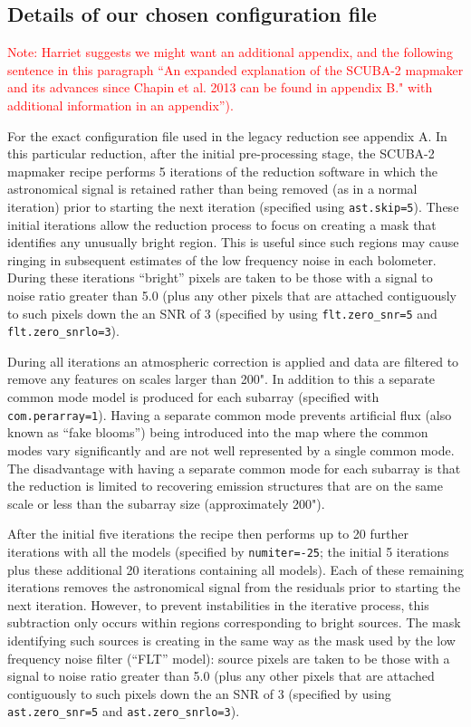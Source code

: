 \documentclass[usenatbib]{mnras}
\newcommand{\note}[1]{\textcolor{red}{Note: #1}}
\begin{document}
\subsection{Details of our chosen configuration file}

\note{Harriet suggests we might want an additional appendix, and the
  following sentence in this paragraph ``An expanded explanation of
  the SCUBA-2 mapmaker and its advances since Chapin et al. 2013 can
  be found in appendix B." with additional information in an
  appendix'').}



For the exact configuration file used in the legacy reduction see
appendix A. In this particular reduction, after the initial
pre-processing stage, the SCUBA-2 mapmaker recipe performs 5
iterations of the reduction software in which the astronomical signal
is retained rather than being removed (as in a normal iteration) prior
to starting the next iteration (specified using \texttt{ast.skip=5}). These
initial iterations allow the reduction process to focus on creating a
mask that identifies any unusually bright region. This is useful since
such regions may cause ringing in subsequent estimates of the low
frequency noise in each bolometer. During these iterations ``bright''
pixels are taken to be those with a signal to noise ratio greater than
5.0 (plus any other pixels that are attached contiguously to such
pixels down the an SNR of 3 (specified by using \texttt{flt.zero\_snr=5} and
\texttt{flt.zero\_snrlo=3}).

During all iterations an atmospheric correction is applied and data
are filtered to remove any features on scales larger than 200". In
addition to this a separate common mode model is produced for each
subarray (specified with \texttt{com.perarray=1}). Having a separate common
mode prevents artificial flux (also known as ``fake blooms'') being
introduced into the map where the common modes vary significantly and
are not well represented by a single common mode. The disadvantage
with having a separate common mode for each subarray is that the
reduction is limited to recovering emission structures that are on the
same scale or less than the subarray size (approximately 200").

After the initial five iterations the recipe then performs up to 20
further iterations with all the models (specified by
\texttt{numiter=-25}; the initial 5 iterations plus these additional 20
iterations containing all models). Each of these remaining iterations
removes the astronomical signal from the residuals prior to starting
the next iteration. However, to prevent instabilities in the iterative
process, this subtraction only occurs within regions corresponding to
bright sources.  The mask identifying such sources is creating in the
same way as the mask used by the low frequency noise filter (``FLT''
model): source pixels are taken to be those with a signal to noise
ratio greater than 5.0 (plus any other pixels that are attached
contiguously to such pixels down the an SNR of 3 (specified by using
\texttt{ast.zero\_snr=5} and \texttt{ast.zero\_snrlo=3}).
\end{document}
